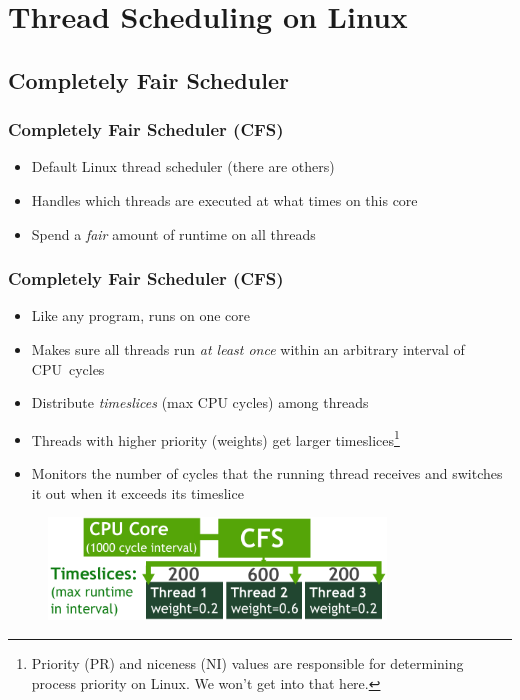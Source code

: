 \documentclass{beamer}
\newcommand{\linespace}{\vskip 0.25cm}
\begin{document}
\section[Thread Scheduling]{Thread Scheduling on Linux}
\subsection[CFS]{Completely Fair Scheduler}
\begin{frame}
\frametitle{Completely Fair Scheduler (CFS)}

\begin{itemize}
\item Default Linux thread scheduler (there are others)
\item Handles which threads are executed at what times on this core
\item Spend a \emph{fair} amount of runtime on all threads
\end{itemize}

\end{frame}


\begin{frame}
\frametitle{Completely Fair Scheduler (CFS)}

\begin{itemize}
\item Like any program, runs on one core
\item Makes sure all threads run \emph{at least once} within an arbitrary interval of CPU~cycles
\item Distribute \emph{timeslices} (max CPU cycles) among threads
\item Threads with higher priority (weights) get larger timeslices\footnote{Priority (PR) and niceness (NI) values are responsible for determining process priority on Linux. We won't get into that here.}
\item Monitors the number of cycles that the running thread receives and switches it out when it exceeds its timeslice
\end{itemize}

\begin{figure}
		\includegraphics[width=0.8\textwidth]{Illustrations/CFS}
		\label{fig:cfs}
\end{figure}

\linespace

\end{frame}
\end{document}
